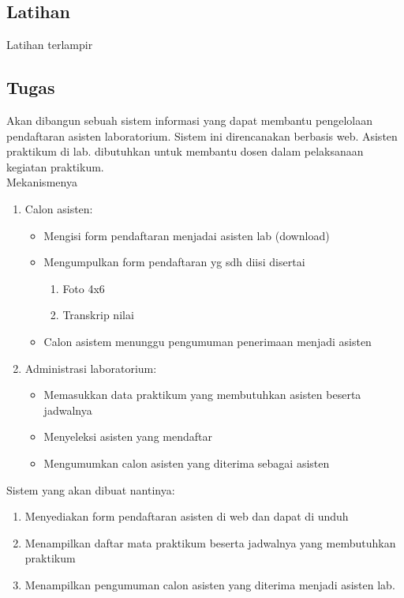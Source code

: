 \documentclass[a4paper,12pt]{article}
\begin{document}
\subsection{Latihan}
    Latihan terlampir

\newpage
\subsection{Tugas}
Akan dibangun sebuah sistem informasi yang dapat membantu pengelolaan pendaftaran asisten laboratorium. Sistem ini
direncanakan berbasis web. Asisten praktikum di lab. dibutuhkan untuk membantu dosen dalam pelaksanaan kegiatan
praktikum.\\
Mekanismenya
\begin{enumerate}
   \item Calon asisten:
       \begin{itemize}
          \item Mengisi form pendaftaran menjadai asisten lab (download) 
          \item Mengumpulkan form pendaftaran yg sdh diisi disertai 
              \begin{enumerate}[label=\alph*.]
                  \item Foto 4x6
                  \item Transkrip nilai
              \end{enumerate}
         \item Calon asistem menunggu pengumuman penerimaan menjadi asisten
       \end{itemize}
    
    \item Administrasi laboratorium:
        \begin{itemize}
           \item Memasukkan data praktikum yang membutuhkan asisten beserta jadwalnya
           \item Menyeleksi asisten yang mendaftar
           \item Mengumumkan calon asisten yang diterima sebagai asisten
        \end{itemize}
\end{enumerate}

Sistem yang akan dibuat nantinya:
\begin{enumerate}[label=\alph*.]
   \item Menyediakan form pendaftaran asisten di web dan dapat di unduh
   \item Menampilkan daftar mata praktikum beserta jadwalnya yang membutuhkan praktikum
   \item Menampilkan pengumuman calon asisten yang diterima menjadi asisten lab.
\end{enumerate}
\end{document}
